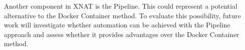 Another component in XNAT is the Pipeline. This could represent a potential alternative to the Docker Container method. To evaluate this possibility, future work will investigate whether automation can be achieved with the Pipeline approach and assess whether it provides advantages over the Docker Container method.

